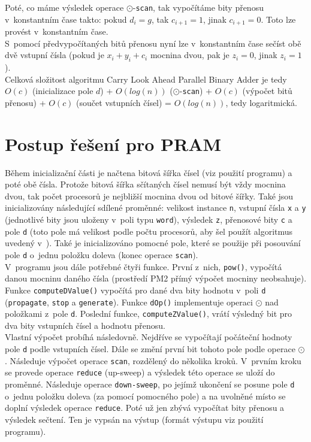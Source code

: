 \documentclass[11pt,a4paper]{article}
\begin{document}
\noindent
Poté, co máme výsledek operace $\odot$-\texttt{scan}, tak vypočítáme
bity přenosu v~konstantním čase takto: pokud $d_{i} = g$, tak
$c_{i+1} = 1$, jinak $c_{i+1} = 0$. Toto lze provést v~konstantním čase. \\

\noindent
S~pomocí předvypočítaných bitů přenosu nyní lze v~konstantním čase
sečíst obě dvě vstupní čísla (pokud je $x_{i} + y_{i} + c_{i}$ mocnina
dvou, pak je $z_{i} = 0$, jinak $z_{i} = 1$). \\

\noindent
Celková složitost algoritmu Carry Look Ahead Parallel Binary Adder je
tedy $O(c)$ (inicializace pole $d$) + $O(log(n))$ ($\odot$-\texttt{scan}) +
$O(c)$ (výpočet bitů přenosu) + $O(c)$ (součet vstupních čísel) = $O(log(n))$,
tedy logaritmická.

\section{Postup řešení pro PRAM}

Během inicializační části je načtena bitová šířka čísel (viz použití programu)
a poté obě čísla. Protože bitová šířka sčítaných čísel nemusí být vždy mocnina dvou, tak
počet procesorů je nejbližší mocnina dvou od bitové šířky.
Také jsou inicializovány následující sdílené proměnné:
velikost instance \texttt{n}, vstupní čísla \texttt{x} a \texttt{y} (jednotlivé
bity jsou uloženy v~poli typu \texttt{word}), výsledek \texttt{z},
přenosové bity \texttt{c} a pole \texttt{d} (toto pole má velikost podle
počtu procesorů, aby šel použít algoritmus uvedený v~\cite{1}).
Také je inicializováno pomocné pole, které se použije při posouvání pole \texttt{d}
o~jednu položku doleva (konec operace \texttt{scan}). \\

\noindent
V~programu jsou dále potřebné čtyři funkce. První z~nich, \texttt{pow()},
vypočítá danou mocninu daného čísla (prostředí PM2 přímý výpočet mocniny neobsahuje).
Funkce \texttt{computeDValue()} vypočítá pro dané dva bity hodnotu v~poli \texttt{d}
(\texttt{propagate}, \texttt{stop} a \texttt{generate}).
Funkce \texttt{dOp()} implementuje operaci $\odot$ nad položkami z~pole \texttt{d}.
Poslední funkce, \texttt{computeZValue()}, vrátí výsledný bit pro dva bity vstupních čísel
a hodnotu přenosu. \\

\noindent
Vlastní výpočet probíhá následovně. Nejdříve se vypočítají počáteční hodnoty
pole \texttt{d} podle vstupních čísel. Dále se změní první bit tohoto
pole podle operace $\odot$. Následuje výpočet operace \texttt{scan}, rozdělený
do několika kroků. V~prvním kroku se provede operace \texttt{reduce} (up-sweep)
a výsledek této operace se uloží do proměnné.
Následuje operace \texttt{down-sweep}, po jejímž ukončení se posune pole \texttt{d}
o~jednu položku doleva (za pomocí pomocného pole) a na uvolněné místo
se doplní výsledek operace \texttt{reduce}. Poté už jen zbývá vypočítat
bity přenosu a výsledek sečtení. Ten je vypsán na výstup (formát výstupu viz
použití programu). \\
\end{document}
